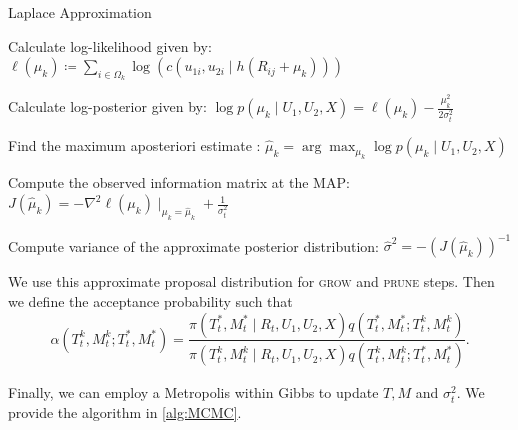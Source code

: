 \documentclass{amsart}
\begin{document}
\begin{algorithm}[H]
	\caption{Laplace Approximation}\label{alg:laplace:appx}
	\begin{algorithmic}[1]
		\State Calculate log-likelihood given by: $\ell(\mu_k)\coloneqq\sum_{i\in \Omega_k}\log\left(c\left(u_{1i},u_{2i}\mid h\left(R_{ij}+\mu_k\right)\right)\right)$
		
		\State Calculate log-posterior given by: $\log p(\mu_k\mid U_1,U_2, X) = \ell(\mu_k) - \frac{\mu_k^2}{2\sigma_{t}^2}$
		
		\State Find the maximum aposteriori estimate : $\hat{\mu}_k = \arg\max_{\mu_k}\log p(\mu_k\mid U_1,U_2, X)$
		
		\State Compute the observed information matrix at the MAP:
		$J(\hat{\mu}_k) = -\nabla^2\ell(\mu_k)\mid_{\mu_k = \hat{\mu}_k}+\frac{1}{\sigma_t^2}$
		
		\State Compute variance of the approximate posterior distribution: $\hat{\sigma}^2 = -(J(\hat{\mu}_k))^{-1}$
		
	\end{algorithmic}
\end{algorithm}
We use this approximate proposal distribution for \textsc{grow} and \textsc{prune} steps. Then we define the acceptance probability such that
\begin{equation}\label{eq:acc:prob}
	\alpha\left(T_t^k,M_t^k;T_t^\ast, M_t^\ast\right)
	= \frac{\pi(T_t^\ast,M_t^\ast \mid R_t, U_1, U_2, X)q\left(T_t^\ast, M_t^\ast;T_t^k,M_t^k\right)}
	{\pi(T_t^k,M_t^k \mid R_t, U_1, U_2, X)q\left(T_t^k,M_t^k;T_t^\ast, M_t^\ast\right)}.
\end{equation}

Finally, we can employ a Metropolis within Gibbs to update $T,M$ and $\sigma_{t}^2$. We provide the algorithm in \cref{alg:MCMC}.
 
\end{document}
